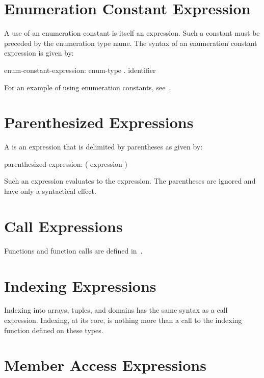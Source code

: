 \section{Enumeration Constant Expression}
\label{Enumeration_Constant_Expression}

A use of an enumeration constant is itself an expression.  Such a
constant must be preceded by the enumeration type name.  The syntax of
an enumeration constant expression is given by:
\begin{syntax}
enum-constant-expression:
  enum-type . identifier
\end{syntax}

\begin{example}
For an example of using enumeration constants,
see~.
\end{example}

\section{Parenthesized Expressions}
\label{Parenthesized_Expressions}

A  is an expression that is delimited
by parentheses as given by:
\begin{syntax}
parenthesized-expression:
  ( expression )
\end{syntax}
Such an expression evaluates to the expression.  The parentheses are
ignored and have only a syntactical effect.

\section{Call Expressions}
\label{Call_Expressions}

Functions and function calls are defined in~.

\section{Indexing Expressions}
\label{Indexing_Expressions}

Indexing into arrays, tuples, and domains has the same syntax as a
call expression.  Indexing, at its core, is nothing more than a call
to the indexing function defined on these types.

\section{Member Access Expressions}
\label{Member_Access_Expressions}

